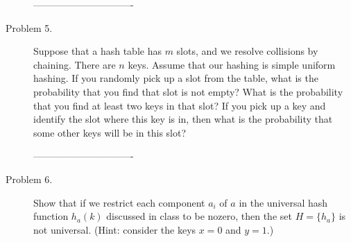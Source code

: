 \documentclass[11pt]{article}
\begin{document}
\begin{description}
\begin{comment}
(b). Let $x_i$ be the number of keys in slot $i$. Then, we have:
\begin{eqnarray}
P_k &=& P\{M=k\} \\
&=& P\{(\max_i \quad x_i)=k\} \\
&=& P\{(\exists i \quad \mbox{such that}\quad x_i=k) \quad \mbox{and} \quad
(\forall i, x_i \le k)\} \\
&\le& P\{(\exists i \quad \mbox{such that}\quad x_i=k)\} \\
&=& P\{ (x_1=k) \quad \mbox{or} \quad (x_2=k) \quad \mbox{or} \quad (x_3=k)
\quad \mbox{or} \quad ... \quad \mbox{or} \quad  (x_n=k) \} \\
&\le& \sum_{i} P\{ x_i=k \} \\
&=& nQ_k
\end{eqnarray}

\end{comment}-------------------------------


\item[Problem 5.]
Suppose that a hash table has $m$ slots, and we resolve collisions by chaining. There are $n$ keys.
Assume that our hashing is simple uniform hashing. If you randomly pick up a slot from the table,
what is the probability that you find that slot is not empty? What is the probability that you find
at least two keys in that slot? If you pick up a key and identify the slot where this key is in,
then what is the probability that some other keys will be in this slot?

\begin{comment}-------------------------------

\noindent \textbf{Solution:}

Probability that a key is in a randomly picked slot is $q=\frac{1}{m}$, and the
probability that a key is in other remaining slots is $1-q$.

Probability that a randomly picked slot is not empty is:
$1-(1-q)^n=1-(\frac{m-1}{m})^n$.

Probability that a randomly picked slot has at least two keys:
\begin{eqnarray}
&1-(1-q)^n-n*q*(1-q)^{(n-1)} \nonumber \\
&=1-(\frac{m-1}{m})^n- n*(1/m)*(\frac{m-1}{m})^{(n-1)} \nonumber
\end{eqnarray}

If you identify the slot where a given key is in, then the probability that
some other key(s) will be in this slot is $1-((m-1)/m)^{n-1}$.

\end{comment}-------------------------------

\item[Problem 6.]
Show that if we restrict each component $a_i$ of $a$ in the universal hash function $h_a(k)$
discussed in class to be nozero, then the set $H=\{h_a\}$ is not universal. (Hint: consider the
keys $x=0$ and $y=1$.)

\end{description}
\end{document}
